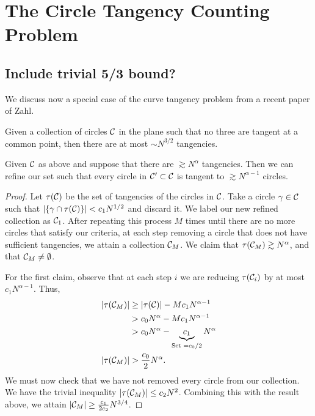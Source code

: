 \chapter{The Circle Tangency Counting Problem}
\section{Include trivial 5/3 bound?}

We discuss now a special case of the curve tangency problem from a recent paper of Zahl. \cite{ellenberg2016new}

\begin{theorem}
    Given a collection of circles $\mathcal C$ in the plane such that no three are tangent at a common point, then there are at most $\sim N^{3/2}$ tangencies. 
\end{theorem}
\begin{lemma}
    Given $\mathcal C$ as above and suppose that there are $\gtrsim N^{\alpha}$ tangencies. Then we can refine our set such that every circle in $\mathcal C' \subset \mathcal C$ is tangent to $\gtrsim N^{\alpha -1}$ circles.
\end{lemma}
\begin{proof}
Let $\tau(\mathcal C)$ be the set of tangencies of the circles in $\mathcal C$. Take a circle $\gamma \in \mathcal C$ such that $|\{\gamma \cap \tau(\mathcal C)\}| < c_1 N^{1/2}$
and discard it. We label our new refined collection as $\mathcal C_1$. After repeating this process $M$ times until there are no more circles that satisfy our criteria, at each step removing a circle that does not have sufficient
tangencies, we attain a collection $\mathcal C_M$. We claim that $\tau(\mathcal C_M) \gtrsim N^{\alpha}$, and that $\mathcal C_M \neq \emptyset$.

For the first claim, observe that at each step $i$ we are reducing $\tau(\mathcal C_i)$ by at most $c_1 N^{\alpha -1}$.  Thus,
\begin{align*}
    |\tau(\mathcal C_M)| &\geq |\tau(\mathcal C)| - M c_1 N^{\alpha -1} \\
    &> c_0 N^{\alpha} -  M c_1 N^{\alpha -1} \\ 
    &> c_0 N^{\alpha} - \underbrace{c_1}_{\text{Set } = c_0/2} N^{\alpha} \\
    |\tau(\mathcal C_M)| &> \frac{c_0}{2} N^{\alpha}.
\end{align*}
We must now check that we have not removed every circle from our collection. We have the trivial inequality $|\tau(\mathcal C_M)| \leq c_2 N^{2}$. Combining this with the result above, we attain $|\mathcal C_M| \geq \frac{c_1}{2c_2} N^{3/4}$.
\end{proof}
